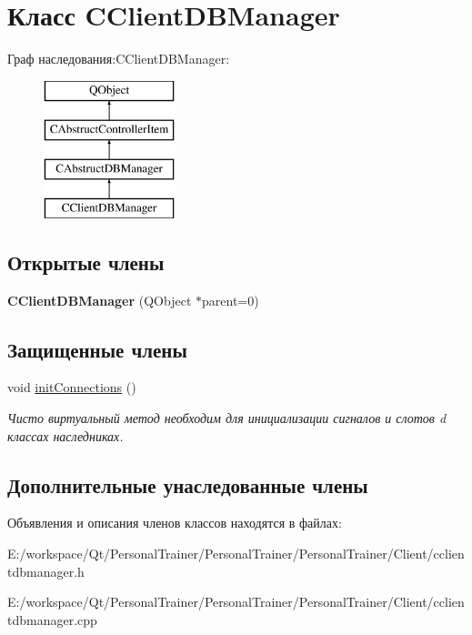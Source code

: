 \hypertarget{class_c_client_d_b_manager}{}\section{Класс C\+Client\+D\+B\+Manager}
\label{class_c_client_d_b_manager}
Граф наследования\+:C\+Client\+D\+B\+Manager\+:\begin{figure}[H]
\begin{center}
\leavevmode
\includegraphics[height=4.000000cm]{class_c_client_d_b_manager}
\end{center}
\end{figure}
\subsection*{Открытые члены}
\begin{DoxyCompactItemize}
\item 
\hypertarget{class_c_client_d_b_manager_aaac2c483f7a445d8565a6dd35f1a77b9}{}\label{class_c_client_d_b_manager_aaac2c483f7a445d8565a6dd35f1a77b9} 
{\bfseries C\+Client\+D\+B\+Manager} (Q\+Object $\ast$parent=0)
\end{DoxyCompactItemize}
\subsection*{Защищенные члены}
\begin{DoxyCompactItemize}
\item 
\hypertarget{class_c_client_d_b_manager_a85d962d6f61d8f9480b6bc9a7f121204}{}\label{class_c_client_d_b_manager_a85d962d6f61d8f9480b6bc9a7f121204} 
void \hyperlink{class_c_client_d_b_manager_a85d962d6f61d8f9480b6bc9a7f121204}{init\+Connections} ()
\begin{DoxyCompactList}\small\item\em Чисто виртуальный метод необходим для инициализации сигналов и слотов d классах наследниках. \end{DoxyCompactList}\end{DoxyCompactItemize}
\subsection*{Дополнительные унаследованные члены}


Объявления и описания членов классов находятся в файлах\+:\begin{DoxyCompactItemize}
\item 
E\+:/workspace/\+Qt/\+Personal\+Trainer/\+Personal\+Trainer/\+Personal\+Trainer/\+Client/cclientdbmanager.\+h\item 
E\+:/workspace/\+Qt/\+Personal\+Trainer/\+Personal\+Trainer/\+Personal\+Trainer/\+Client/cclientdbmanager.\+cpp\end{DoxyCompactItemize}
